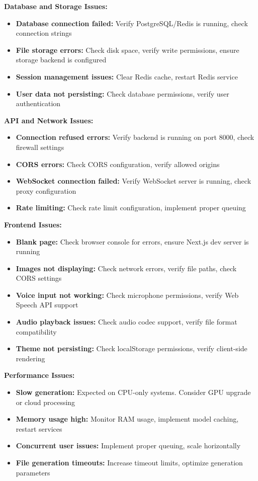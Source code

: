 {\textbf{Database and Storage Issues:}
\begin{itemize}
    \item \textbf{Database connection failed:} Verify PostgreSQL/Redis is running, check connection strings
    \item \textbf{File storage errors:} Check disk space, verify write permissions, ensure storage backend is configured
    \item \textbf{Session management issues:} Clear Redis cache, restart Redis service
    \item \textbf{User data not persisting:} Check database permissions, verify user authentication
\end{itemize}

\textbf{API and Network Issues:}
\begin{itemize}
    \item \textbf{Connection refused errors:} Verify backend is running on port 8000, check firewall settings
    \item \textbf{CORS errors:} Check CORS configuration, verify allowed origins
    \item \textbf{WebSocket connection failed:} Verify WebSocket server is running, check proxy configuration
    \item \textbf{Rate limiting:} Check rate limit configuration, implement proper queuing
\end{itemize}

\textbf{Frontend Issues:}
\begin{itemize}
    \item \textbf{Blank page:} Check browser console for errors, ensure Next.js dev server is running
    \item \textbf{Images not displaying:} Check network errors, verify file paths, check CORS settings
    \item \textbf{Voice input not working:} Check microphone permissions, verify Web Speech API support
    \item \textbf{Audio playback issues:} Check audio codec support, verify file format compatibility
    \item \textbf{Theme not persisting:} Check localStorage permissions, verify client-side rendering
\end{itemize}

\textbf{Performance Issues:}
\begin{itemize}
    \item \textbf{Slow generation:} Expected on CPU-only systems. Consider GPU upgrade or cloud processing
    \item \textbf{Memory usage high:} Monitor RAM usage, implement model caching, restart services
    \item \textbf{Concurrent user issues:} Implement proper queuing, scale horizontally
    \item \textbf{File generation timeouts:} Increase timeout limits, optimize generation parameters
\end{itemize}

}
